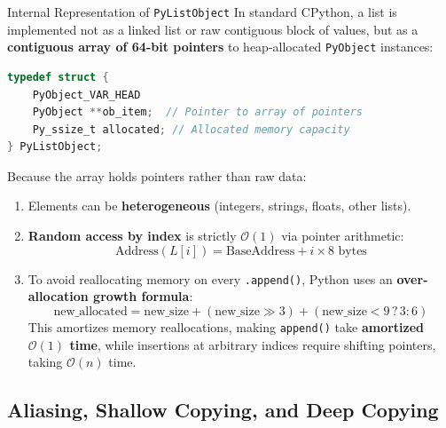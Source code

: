 \begin{definitionbox}{Internal Representation of \texttt{PyListObject}}
 
In standard CPython, a list is implemented not as a linked list or raw contiguous block of values, but as a \textbf{contiguous array of 64-bit pointers} to heap-allocated \texttt{PyObject} instances:
\begin{lstlisting}[language=C]
typedef struct {
    PyObject_VAR_HEAD
    PyObject **ob_item;  // Pointer to array of pointers
    Py_ssize_t allocated; // Allocated memory capacity
} PyListObject;
\end{lstlisting}
Because the array holds pointers rather than raw data:
\begin{enumerate}
    \item Elements can be \textbf{heterogeneous} (integers, strings, floats, other lists).
    \item \textbf{Random access by index} is strictly $\mathcal{O}(1)$ via pointer arithmetic:
    \begin{equation}
    \text{Address}(L[i]) = \text{BaseAddress} + i \times 8 \text{ bytes}
    \end{equation}
    \item To avoid reallocating memory on every \texttt{.append()}, Python uses an \textbf{over-allocation growth formula}:
    \begin{equation}
    \text{new\_allocated} = \text{new\_size} + (\text{new\_size} \gg 3) + (\text{new\_size} < 9 \mathrel{?} 3 : 6)
    \end{equation}
    This amortizes memory reallocations, making \texttt{append()} take \textbf{amortized $\mathcal{O}(1)$ time}, while insertions at arbitrary indices require shifting pointers, taking $\mathcal{O}(n)$ time.
\end{enumerate}
\end{definitionbox}

\subsection{Aliasing, Shallow Copying, and Deep Copying}

